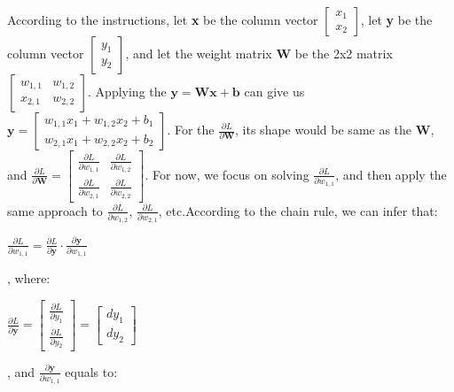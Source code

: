 \documentclass[12pt]{article}
\begin{document}
According to the instructions, let \textbf{x} be the column vector
$\left[
\begin{matrix}
x_{1}\\
x_{2}
\end{matrix}
\right]$, let \textbf{y} be the column vector
$\left[
\begin{matrix}
y_{1}\\
y_{2}
\end{matrix}
\right]$, and let the weight matrix \textbf{W} be the 2x2 matrix
$\left[
\begin{matrix}
w_{1,1} & w_{1,2}\\
x_{2,1} & w_{2,2}
\end{matrix}
\right]$. Applying the $\textbf{y} = \textbf{W}\textbf{x} + \textbf{b}$ can give us $\textbf{y} = 
\left[\begin{matrix}
w_{1,1}x_{1}+w_{1,2}x_{2}+b_{1}\\
w_{2,1}x_{1}+w_{2,2}x_{2}+b_{2}
\end{matrix}\right]$. For the $\frac{\partial L}{\partial\textbf{W}}$, its shape would be same as the \textbf{W}, and $\frac{\partial L}{\partial\textbf{W}} = 
\left[\begin{matrix}
\frac{\partial L}{\partial w_{1,1}} & \frac{\partial L}{\partial w_{1,2}}\\
\frac{\partial L}{\partial w_{2,1}} & \frac{\partial L}{\partial w_{2,2}}
\end{matrix}\right]$. For now, we focus on solving $\frac{\partial L}{\partial w_{1,1}}$, and then apply the same approach to $\frac{\partial L}{\partial w_{1,2}}$, $\frac{\partial L}{\partial w_{2,1}}$, etc.According to the chain rule, we can infer that:
\begin{center}
    $\frac{\partial L}{\partial w_{1,1}} = \frac{\partial L}{\partial \textbf{y}}\cdot\frac{\partial\textbf{y}}{\partial w_{1,1}}$
\end{center}, where:
\begin{center}
    $
    \frac{\partial L}{\partial \textbf{y}} = 
    \left[\begin{matrix}
    \frac{\partial L}{\partial y_{1}}\\
    \frac{\partial L}{\partial y_{2}}
    \end{matrix}\right] = 
    \left[\begin{matrix}
    dy_{1}\\
    dy_{2}
    \end{matrix}\right]$
\end{center}, and $\frac{\partial\textbf{y}}{\partial w_{1,1}}$ equals to:
\end{document}
